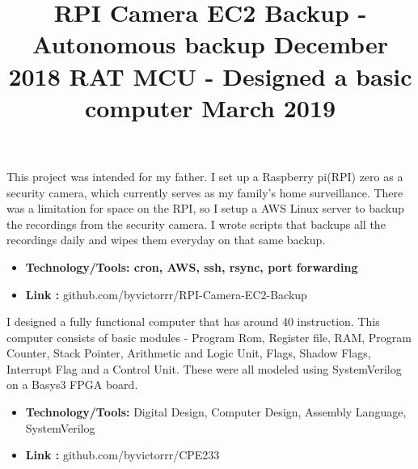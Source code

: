 \documentclass[margin]{res}
\begin{document}
\begin{resume}
{%
\location{}
\title{\textbf{ RPI Camera EC2 Backup - Autonomous backup  \hfill December 2018}}
\begin{position}
This project was intended for my father. I set up a Raspberry pi(RPI) zero as a security camera, which currently serves as my family’s home surveillance. There was a limitation for space on the RPI, so I setup a AWS Linux server to backup the recordings from the security camera. I wrote scripts that backups all the recordings daily and wipes them everyday on that same backup.
\begin{itemize}
\item \textbf{Technology/Tools: cron, AWS, ssh, rsync, port forwarding}
\end{itemize}
\begin{itemize}
\item \textbf{Link :} github.com/byvictorrr/RPI-Camera-EC2-Backup
\end{itemize}
\end{position}



\location{}
\title{\textbf{ RAT MCU - Designed a basic computer  \hfill March 2019}}
\begin{position}
I designed a fully functional computer that has around 40 instruction. This computer consists of basic modules - Program Rom, Register file, RAM, Program Counter, Stack Pointer, Arithmetic and Logic Unit, Flags, Shadow Flags, Interrupt Flag and a Control Unit. These were all modeled using SystemVerilog on a Basys3 FPGA board. 
\begin{itemize}
\item \textbf{Technology/Tools:} Digital Design, Computer Design, Assembly Language, SystemVerilog
\end{itemize}
\begin{itemize}
\item \textbf{Link :} github.com/byvictorrr/CPE233
\end{itemize}
\end{position}



}
\end{resume}
\end{document}
